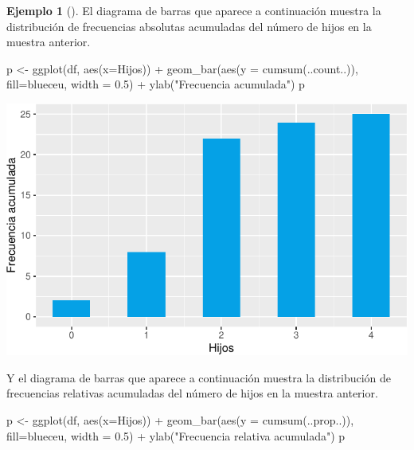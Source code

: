 \documentclass[
  a4paper,
]{scrreport}
\newenvironment{Shaded}{\begin{snugshade}}{\end{snugshade}}
\newcommand{\AttributeTok}[1]{\textcolor[rgb]{0.40,0.45,0.13}{#1}}
\newcommand{\FloatTok}[1]{\textcolor[rgb]{0.68,0.00,0.00}{#1}}
\newcommand{\FunctionTok}[1]{\textcolor[rgb]{0.28,0.35,0.67}{#1}}
\newcommand{\NormalTok}[1]{\textcolor[rgb]{0.00,0.23,0.31}{#1}}
\newcommand{\OtherTok}[1]{\textcolor[rgb]{0.00,0.23,0.31}{#1}}
\newcommand{\SpecialCharTok}[1]{\textcolor[rgb]{0.37,0.37,0.37}{#1}}
\newcommand{\StringTok}[1]{\textcolor[rgb]{0.13,0.47,0.30}{#1}}
\theoremstyle{plain}
\theoremstyle{definition}
\theoremstyle{definition}
\newtheorem{example}{Ejemplo}[chapter]
\theoremstyle{remark}
\begin{document}
\begin{example}[]
El diagrama de barras que aparece a continuación muestra la distribución
de frecuencias absolutas acumuladas del número de hijos en la muestra
anterior.

\begin{Shaded}
\begin{Highlighting}[]
\NormalTok{p }\OtherTok{\textless{}{-}} \FunctionTok{ggplot}\NormalTok{(df, }\FunctionTok{aes}\NormalTok{(}\AttributeTok{x=}\NormalTok{Hijos)) }\SpecialCharTok{+} 
    \FunctionTok{geom\_bar}\NormalTok{(}\FunctionTok{aes}\NormalTok{(}\AttributeTok{y =} \FunctionTok{cumsum}\NormalTok{(..count..)), }\AttributeTok{fill=}\NormalTok{blueceu, }\AttributeTok{width =} \FloatTok{0.5}\NormalTok{) }\SpecialCharTok{+}
    \FunctionTok{ylab}\NormalTok{(}\StringTok{"Frecuencia acumulada"}\NormalTok{)}
\NormalTok{p}
\end{Highlighting}
\end{Shaded}

\includegraphics{02-estadistica-descriptiva_files/figure-pdf/diagrama-barras-acumuladas-1.pdf}

Y el diagrama de barras que aparece a continuación muestra la
distribución de frecuencias relativas acumuladas del número de hijos en
la muestra anterior.

\begin{Shaded}
\begin{Highlighting}[]
\NormalTok{p }\OtherTok{\textless{}{-}} \FunctionTok{ggplot}\NormalTok{(df, }\FunctionTok{aes}\NormalTok{(}\AttributeTok{x=}\NormalTok{Hijos)) }\SpecialCharTok{+} 
    \FunctionTok{geom\_bar}\NormalTok{(}\FunctionTok{aes}\NormalTok{(}\AttributeTok{y =} \FunctionTok{cumsum}\NormalTok{(..prop..)), }\AttributeTok{fill=}\NormalTok{blueceu, }\AttributeTok{width =} \FloatTok{0.5}\NormalTok{) }\SpecialCharTok{+}
    \FunctionTok{ylab}\NormalTok{(}\StringTok{"Frecuencia relativa acumulada"}\NormalTok{)}
\NormalTok{p}
\end{Highlighting}
\end{Shaded}


\end{example}
\end{document}
